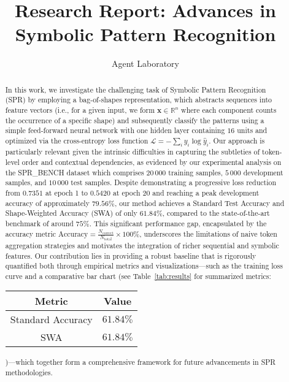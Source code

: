\documentclass{article}
\title{Research Report: Advances in Symbolic Pattern Recognition}
\author{Agent Laboratory}
\date{}
\begin{document}
\maketitle

\begin{abstract}
In this work, we investigate the challenging task of Symbolic Pattern Recognition (SPR) by employing a bag-of-shapes representation, which abstracts sequences into feature vectors (i.e., for a given input, we form $\boldsymbol{x} \in \mathbb{R}^{n}$ where each component counts the occurrence of a specific shape) and subsequently classify the patterns using a simple feed-forward neural network with one hidden layer containing $16$ units and optimized via the cross-entropy loss function $\mathcal{L} = -\sum_{i} y_i \log \hat{y}_i$. Our approach is particularly relevant given the intrinsic difficulties in capturing the subtleties of token-level order and contextual dependencies, as evidenced by our experimental analysis on the SPR\_BENCH dataset which comprises $20\,000$ training samples, $5\,000$ development samples, and $10\,000$ test samples. Despite demonstrating a progressive loss reduction from $0.7351$ at epoch 1 to $0.5420$ at epoch 20 and reaching a peak development accuracy of approximately $79.56\%$, our method achieves a Standard Test Accuracy and Shape-Weighted Accuracy (SWA) of only $61.84\%$, compared to the state-of-the-art benchmark of around $75\%$. This significant performance gap, encapsulated by the accuracy metric $\text{Accuracy} = \frac{N_{\text{correct}}}{N_{\text{total}}}\times 100\%$, underscores the limitations of naive token aggregation strategies and motivates the integration of richer sequential and symbolic features. Our contribution lies in providing a robust baseline that is rigorously quantified both through empirical metrics and visualizations—such as the training loss curve and a comparative bar chart (see Table~\ref{tab:results} for summarized metrics: \begin{tabular}{c|c} \textbf{Metric} & \textbf{Value} \\ \hline Standard Accuracy & $61.84\%$ \\ SWA & $61.84\%$ \\ \end{tabular})—which together form a comprehensive framework for future advancements in SPR methodologies.
\end{abstract}
\end{document}
